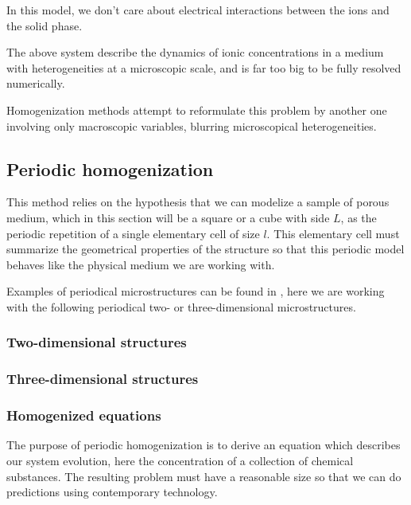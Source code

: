 In this model, we don't care about electrical interactions between the ions and the solid phase.

\ligneinter
The above system describe the dynamics of ionic concentrations in a medium with heterogeneities at a microscopic scale, %
and is far too big to be fully resolved numerically.

\par
Homogenization methods attempt to reformulate this problem by another one involving only macroscopic variables, %
\og{} blurring \fg{} microscopical heterogeneities.

\subsection{Periodic homogenization}

This method relies on the hypothesis that we can modelize a sample of porous medium, %
which in this section will be a square or a cube with side $L$, %
as the periodic repetition of a single elementary cell of size $l$. %
This elementary cell must summarize the geometrical properties of the structure so that this periodic model behaves like the physical medium we are working with.

\par
Examples of periodical microstructures can be found in \cite{WalMill16}, here we are working with the following periodical two- or three-dimensional microstructures.

\subsubsection{Two-dimensional structures}





\subsubsection{Three-dimensional structures}






\subsubsection{Homogenized equations}

The purpose of periodic homogenization is to derive an equation which describes our system evolution, here the concentration of a collection of chemical substances. %
The resulting problem must have a reasonable size so that we can do predictions using contemporary technology.

